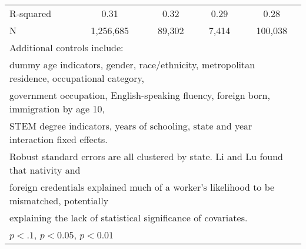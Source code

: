 \begin{table}[htbp]
\begin{tabular}{l*{4}{c}}
R-squared           &        0.31         &        0.32         &        0.29         &        0.28         \\
N                   &   1,256,685         &      89,302         &       7,414         &     100,038         \\
\bottomrule
\multicolumn{5}{l}{\footnotesize Additional controls include:}\\
\multicolumn{5}{l}{\footnotesize dummy age indicators, gender, race/ethnicity, metropolitan residence, occupational category,}\\
\multicolumn{5}{l}{\footnotesize government occupation, English-speaking fluency, foreign born, immigration by age 10,}\\
\multicolumn{5}{l}{\footnotesize STEM degree indicators, years of schooling, state and year interaction fixed effects.}\\
\multicolumn{5}{l}{\footnotesize Robust standard errors are all clustered by state. Li and Lu found that nativity and}\\
\multicolumn{5}{l}{\footnotesize foreign credentials explained much of a worker's likelihood to be mismatched, potentially}\\
\multicolumn{5}{l}{\footnotesize explaining the lack of statistical significance of covariates.}\\
\multicolumn{5}{l}{\footnotesize \sym{*} \(p<.1\), \sym{**} \(p<0.05\), \sym{***} \(p<0.01\)}\\
\end{tabular}
\end{table}
